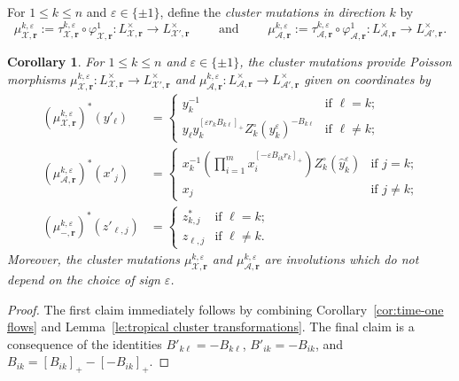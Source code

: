 \documentclass{amsart}
\newtheorem{corollary}[theorem]{Corollary}
\numberwithin{equation}{section}
\newcommand{\bfr}{{\boldsymbol{r}}}
\newcommand{\cA}{\mathcal{A}}
\newcommand{\cX}{\mathcal{X}}
\begin{document}
For $1\le k\le n$ and $\varepsilon\in\{\pm1\}$, define the \emph{cluster mutations in direction $k$} by 
\[\mu_{\cX,\bfr}^{k,\varepsilon}:=\tau_{\cX,\bfr}^{k,\varepsilon}\circ\varphi_{\cX,\bfr}^1:L^\times_{\cX,\bfr}\to L^\times_{\cX',\bfr}\qquad\text{ and }\qquad\mu_{\cA,\bfr}^{k,\varepsilon}:=\tau_{\cA,\bfr}^{k,\varepsilon}\circ\varphi_{\cA,\bfr}^1:L^\times_{\cA,\bfr}\to L^\times_{\cA',\bfr}.\]
\begin{corollary}
  \label{cor:cluster mutation}
  For $1\le k\le n$ and $\varepsilon\in\{\pm1\}$, the cluster mutations provide Poisson morphisms $\mu_{\cX,\bfr}^{k,\varepsilon}:L^\times_{\cX,\bfr}\to L^\times_{\cX',\bfr}$ and $\mu_{\cA,\bfr}^{k,\varepsilon}:L^\times_{\cA,\bfr}\to L^\times_{\cA',\bfr}$ given on coordinates by
  \begin{align}
    \label{eq:X mutation}
    (\mu_{\cX,\bfr}^{k,\varepsilon})^*(y'_\ell)&=\begin{cases} y_k^{-1} & \text{if $\ell=k$;}\\ y_\ell y_k^{[\varepsilon r_kB_{k\ell}]_+} Z_k^\circ(y_k^\varepsilon)^{-B_{k\ell}} & \text{if $\ell\ne k$;}\end{cases}\\
    \label{eq:A mutation}
    (\mu_{\cA,\bfr}^{k,\varepsilon})^*(x'_j)&=\begin{cases} x_k^{-1}\left(\prod\limits_{i=1}^m x_i^{[-\varepsilon B_{ik}r_k]_+}\right)Z_k^\circ(\hat y_k^\varepsilon) & \text{if $j=k$;}\\ x_j & \text{if $j\ne k$;}\end{cases}\\
    \nonumber (\mu_{-,\bfr}^{k,\varepsilon})^*(z'_{\ell,j})
    &=\begin{cases}
      z^*_{k,j} & \text{if $\ell=k$;}\\
      z_{\ell,j} & \text{if $\ell\ne k$.}
    \end{cases}
  \end{align}
  Moreover, the cluster mutations $\mu_{\cX,\bfr}^{k,\varepsilon}$ and $\mu_{\cA,\bfr}^{k,\varepsilon}$ are involutions which do not depend on the choice of sign $\varepsilon$.
\end{corollary}
\begin{proof}
  The first claim immediately follows by combining Corollary~\ref{cor:time-one flows} and Lemma~\ref{le:tropical cluster transformations}.
  The final claim is a consequence of the identities $B'_{k\ell}=-B_{k\ell}$, $B'_{ik}=-B_{ik}$, and $B_{ik}=[B_{ik}]_+-[-B_{ik}]_+$.
\end{proof}
\end{document}

